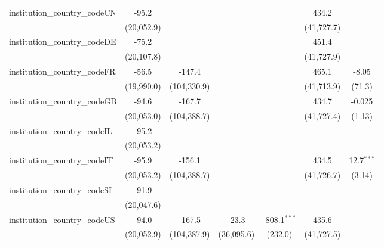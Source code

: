 \begin{tabular}{lcccccc}
   institution\_country\_codeCN          & -95.2         &              &               &                & 434.2         &   \\   
                                         & (20,052.9)    &              &               &                & (41,727.7)    &   \\   
   institution\_country\_codeDE          & -75.2         &              &               &                & 451.4         &   \\   
                                         & (20,107.8)    &              &               &                & (41,727.9)    &   \\   
   institution\_country\_codeFR          & -56.5         & -147.4       &               &                & 465.1         & -8.05\\   
                                         & (19,990.0)    & (104,330.9)  &               &                & (41,713.9)    & (71.3)\\   
   institution\_country\_codeGB          & -94.6         & -167.7       &               &                & 434.7         & -0.025\\   
                                         & (20,053.0)    & (104,388.7)  &               &                & (41,727.4)    & (1.13)\\   
   institution\_country\_codeIL          & -95.2         &              &               &                &               &   \\   
                                         & (20,053.2)    &              &               &                &               &   \\   
   institution\_country\_codeIT          & -95.9         & -156.1       &               &                & 434.5         & 12.7$^{***}$\\   
                                         & (20,053.2)    & (104,388.7)  &               &                & (41,726.7)    & (3.14)\\   
   institution\_country\_codeSI          & -91.9         &              &               &                &               &   \\   
                                         & (20,047.6)    &              &               &                &               &   \\   
   institution\_country\_codeUS          & -94.0         & -167.5       & -23.3         & -808.1$^{***}$ & 435.6         &   \\   
                                         & (20,052.9)    & (104,387.9)  & (36,095.6)    & (232.0)        & (41,727.5)    &   \\   

\end{tabular}
